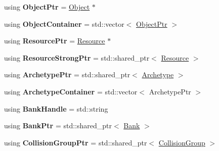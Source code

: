 \begin{DoxyCompactItemize}
\item 
\hypertarget{namespaceDCEngine_a7dd0d927ce60f5d94af00b97af97c317}{using {\bfseries Object\-Ptr} = \hyperlink{classDCEngine_1_1Object}{Object} $\ast$}\label{namespaceDCEngine_a7dd0d927ce60f5d94af00b97af97c317}

\item 
\hypertarget{namespaceDCEngine_a63dd9b4d05157d8d409876b69586040a}{using {\bfseries Object\-Container} = std\-::vector$<$ \hyperlink{classDCEngine_1_1Object}{Object\-Ptr} $>$}\label{namespaceDCEngine_a63dd9b4d05157d8d409876b69586040a}

\item 
\hypertarget{namespaceDCEngine_ac2ff348e5b42025cf6840040fd81b280}{using {\bfseries Resource\-Ptr} = \hyperlink{classDCEngine_1_1Resource}{Resource} $\ast$}\label{namespaceDCEngine_ac2ff348e5b42025cf6840040fd81b280}

\item 
\hypertarget{namespaceDCEngine_a15096c8dd2b828aff8676650ecfc496a}{using {\bfseries Resource\-Strong\-Ptr} = std\-::shared\-\_\-ptr$<$ \hyperlink{classDCEngine_1_1Resource}{Resource} $>$}\label{namespaceDCEngine_a15096c8dd2b828aff8676650ecfc496a}

\item 
\hypertarget{namespaceDCEngine_ab84eebc929136e1a814d40427475038b}{using {\bfseries Archetype\-Ptr} = std\-::shared\-\_\-ptr$<$ \hyperlink{classDCEngine_1_1Archetype}{Archetype} $>$}\label{namespaceDCEngine_ab84eebc929136e1a814d40427475038b}

\item 
\hypertarget{namespaceDCEngine_aa43434dafb709d2ce485003ad34f14ee}{using {\bfseries Archetype\-Container} = std\-::vector$<$ Archetype\-Ptr $>$}\label{namespaceDCEngine_aa43434dafb709d2ce485003ad34f14ee}

\item 
\hypertarget{namespaceDCEngine_a2989333eff6e62b82ef5fc6b8a837dce}{using {\bfseries Bank\-Handle} = std\-::string}\label{namespaceDCEngine_a2989333eff6e62b82ef5fc6b8a837dce}

\item 
\hypertarget{namespaceDCEngine_a03c50ede68479174fa425aa29a02b8ae}{using {\bfseries Bank\-Ptr} = std\-::shared\-\_\-ptr$<$ \hyperlink{classDCEngine_1_1Bank}{Bank} $>$}\label{namespaceDCEngine_a03c50ede68479174fa425aa29a02b8ae}

\item 
\hypertarget{namespaceDCEngine_a676d7adae7cb806710bd268fa4091b48}{using {\bfseries Collision\-Group\-Ptr} = std\-::shared\-\_\-ptr$<$ \hyperlink{classDCEngine_1_1CollisionGroup}{Collision\-Group} $>$}\label{namespaceDCEngine_a676d7adae7cb806710bd268fa4091b48}


\end{DoxyCompactItemize}
